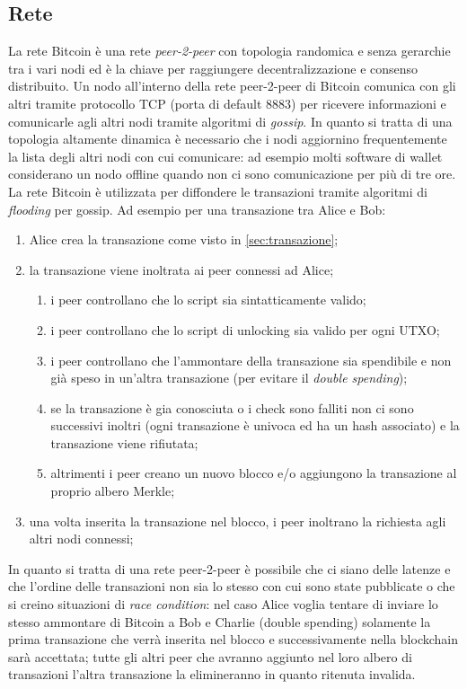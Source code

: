 \subsection{Rete}
La rete Bitcoin è una rete \textit{peer-2-peer} con topologia randomica e senza gerarchie tra i vari nodi ed è la chiave per raggiungere decentralizzazione e consenso distribuito.\newline
Un nodo all'interno della rete peer-2-peer di Bitcoin comunica con gli altri tramite protocollo TCP (porta di default $8883$) per ricevere informazioni e comunicarle agli altri nodi tramite algoritmi di \textit{gossip}. In quanto si tratta di una topologia altamente dinamica è necessario che i nodi aggiornino frequentemente la lista degli altri nodi con cui comunicare: ad esempio molti software di wallet considerano un nodo offline quando non ci sono comunicazione per più di tre ore.\newline
La rete Bitcoin è utilizzata per diffondere le transazioni tramite algoritmi di \textit{flooding} per gossip. Ad esempio per una transazione tra Alice e Bob:
\begin{enumerate}
    \item Alice crea la transazione come visto in \ref{sec:transazione};
    \item la transazione viene inoltrata ai peer connessi ad Alice;
        \begin{enumerate}
            \item i peer controllano che lo script sia sintatticamente valido;
            \item i peer controllano che lo script di unlocking sia valido per ogni UTXO;
            \item i peer controllano che l'ammontare della transazione sia spendibile e non già speso in un'altra transazione (per evitare il \textit{double spending});
            \item se la transazione è gia conosciuta o i check sono falliti non ci sono successivi inoltri (ogni transazione è univoca ed ha un hash associato) e la transazione viene rifiutata;
            \item altrimenti i peer creano un nuovo blocco e/o aggiungono la transazione al proprio albero Merkle;
        \end{enumerate}
    \item una volta inserita la transazione nel blocco, i peer inoltrano la richiesta agli altri nodi connessi;
\end{enumerate}
In quanto si tratta di una rete peer-2-peer è possibile che ci siano delle latenze e che l'ordine delle transazioni non sia lo stesso con cui sono state pubblicate o che si creino situazioni di \textit{race condition}: nel caso Alice voglia tentare di inviare lo stesso ammontare di Bitcoin a Bob e Charlie (double spending) solamente la prima transazione che verrà inserita nel blocco e successivamente nella blockchain sarà accettata; tutte gli altri peer che avranno aggiunto nel loro albero di transazioni l'altra transazione la elimineranno in quanto ritenuta invalida.\newline
